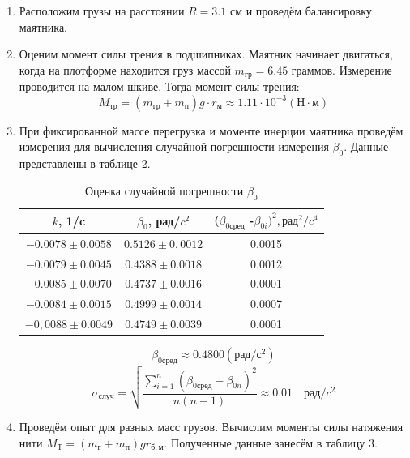 \documentclass[a4paper,12pt]{article}
\begin{document}
\begin{enumerate}
    \item Расположим грузы на расстоянии $R=3.1$ см и проведём балансировку маятника.
    \item Оценим момент силы трения в подшипниках.
    Маятник начинает двигаться, когда на плотформе находится груз массой $m_{\text{гр}}=6.45$ граммов. Измерение проводится на малом шкиве.
    Тогда момент силы трения:
    \begin{displaymath}
        M_{\text{тр}} = (m_{\text{гр}}+m_{\text{п}})g \cdot r_{\text{м}} \approx 1.11 \cdot 10^{-3} (Н \cdot м) 
    \end{displaymath}
    \item При фиксированной массе перегрузка и моменте инерции маятника проведём измерения для вычисления случайной погрешности измерения $\beta_0$. Данные представлены в таблице 2.
    \begin{table}[h]
        \centering
        \begin{tabular}{|c|c|c|}
            \hline
            $k$, 1/c & $\beta_0$, рад/$c^2$ & ($\beta_{0сред}$ -$ \beta_{0i})^2, рад^2 / c^4 $ \\ \hline
	        $ -0.0078\pm 0.0058$ & $ 0.5126\pm 0,0012 $ & 0.0015 \\
        	$ -0.0079\pm 0.0045$ & $ 0.4388\pm 0.0018$ & 0.0012 \\
        	$ -0.0085\pm 0.0070$ & $ 0.4737\pm 0.0016 $ & 0.0001\\
        	$ -0.0084\pm 0.0015$ & $ 0.4999\pm  0.0014$  & 0.0007\\
        	$ -0,0088\pm 0.0049$ & $ 0.4749\pm 0.0039$ & 0.0001\\ 
            \hline
        \end{tabular}
        \caption{Оценка случайной погрешности $\beta_0$}
    \end{table}
    \begin{displaymath}
        \beta_{0сред} \approx 0.4800 (рад/с^2)
    \end{displaymath}
    \begin{displaymath}
        \sigma_{случ}= \sqrt{ \frac{\sum\limits_{i=1}^n (\beta_{0сред} - \beta_{0n})^2}{n(n-1)}} \approx 0.01 \quad рад / c^2
    \end{displaymath}
    \item Проведём опыт для разных масс грузов. Вычислим моменты силы натяжения нити $M_Т = (m_г+m_п)gr_{б,м}$. Полученные данные занесём в таблицу 3.
    \begin{table}[h]

\end{table}
\end{enumerate}
\end{document}
